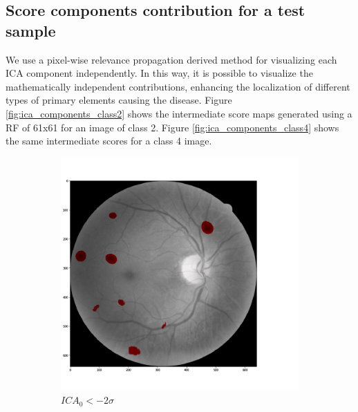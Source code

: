 \subsection{Score components contribution for a test sample}

We use a pixel-wise relevance propagation derived method for visualizing each ICA component independently. In this way, it is possible to visualize the mathematically independent contributions, enhancing the localization of different types of primary elements causing the disease. Figure \ref{fig:ica_components_class2} shows the intermediate score maps generated using a RF of 61x61 for an image of class 2. Figure \ref{fig:ica_components_class4} shows the same intermediate scores for a class 4 image. 

\begin{figure}[h!]
	\centering
	\begin{subfigure}[b]{0.32\textwidth}
		\centering
		\includegraphics[width=\textwidth]{Figures/chapter_ica/figures/img_t2_p2/rf61/ica0.png}
		\caption{$ICA_0 < - 2 \sigma$}	
	\end{subfigure}
	\begin{subfigure}[b]{0.32\textwidth}
		\centering

\end{subfigure}
\end{figure}
